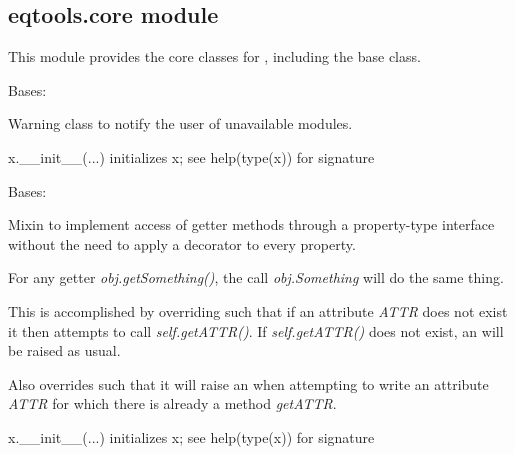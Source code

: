 \documentclass[letterpaper,10pt,english]{sphinxmanual}
\begin{document}
\subsection{eqtools.core module}
\label{eqtools:module-eqtools.core}\label{eqtools:eqtools-core-module}
This module provides the core classes for {\hyperref[eqtools:module-eqtools]{}}, including the
base {\hyperref[eqtools:eqtools.core.Equilibrium]{}} class.

\begin{fulllineitems}
\label{eqtools:eqtools.core.ModuleWarning}
Bases: 

Warning class to notify the user of unavailable modules.

x.\_\_init\_\_(...) initializes x; see help(type(x)) for signature

\end{fulllineitems}


\begin{fulllineitems}
\label{eqtools:eqtools.core.PropertyAccessMixin}
Bases: 

Mixin to implement access of getter methods through a property-type
interface without the need to apply a decorator to every property.

For any getter \emph{obj.getSomething()}, the call \emph{obj.Something} will do the
same thing.

This is accomplished by overriding  such that if
an attribute \emph{ATTR} does not exist it then attempts to call \emph{self.getATTR()}.
If \emph{self.getATTR()} does not exist, an  will be
raised as usual.

Also overrides  such that it will raise an
 when attempting to write an attribute \emph{ATTR} for
which there is already a method \emph{getATTR}.

x.\_\_init\_\_(...) initializes x; see help(type(x)) for signature

\end{fulllineitems}

\end{document}
